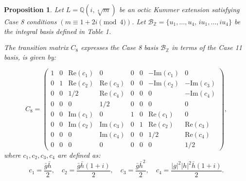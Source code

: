 \documentclass{amsart}
\theoremstyle{plain}
\newtheorem{proposition}[theorem]{Proposition}
\theoremstyle{definition}
\theoremstyle{remark}
\numberwithin{equation}{section}
\begin{document}
\begin{proposition}
Let $L = \mathbb{Q}(i, \sqrt[4]{m})$ be an octic Kummer extension satisfying Case 8 conditions $(m \equiv 1+2i \pmod 4)$. Let $\mathcal{B}_{\mathbb{Z}} = \{u_1, \dots, u_4, \, i u_1, \dots, i u_4\}$ be the integral basis defined in Table 1.

The transition matrix $C_{8}$ expresses the Case 8 basis $\mathcal{B}_{\mathbb{Z}}$ in terms of the Case 11 basis, is given by:

\[
C_{8} = \begin{pmatrix}
1 & 0 & \text{Re}(c_1) & 0 & 0 & 0 & -\text{Im}(c_1) & 0 \\
0 & 1 & \text{Re}(c_2) & \text{Re}(c_3) & 0 & 0 & -\text{Im}(c_2) & -\text{Im}(c_3) \\
0 & 0 & 1/2 & \text{Re}(c_4) & 0 & 0 & 0 & -\text{Im}(c_4) \\
0 & 0 & 0 & 1/2 & 0 & 0 & 0 & 0 \\
0 & 0 & \text{Im}(c_1) & 0 & 1 & 0 & \text{Re}(c_1) & 0 \\
0 & 0 & \text{Im}(c_2) & \text{Im}(c_3) & 0 & 1 & \text{Re}(c_2) & \text{Re}(c_3) \\
0 & 0 & 0 & \text{Im}(c_4) & 0 & 0 & 1/2 & \text{Re}(c_4) \\
0 & 0 & 0 & 0 & 0 & 0 & 0 & 1/2
\end{pmatrix},
\]
where  $c_1,c_2,c_3,c_4$ are defined as:
\[
c_1 = \frac{\bar{g}\bar{h}}{2}, \quad c_2 = \frac{\bar{g}\bar{h}(1+i)}{2}, \quad c_3 = \frac{\bar{g}\bar{h}^2}{2}, \quad c_4 = \frac{|g|^2|h|^2 \bar{h}(1+i)}{2}.
\]


\end{proposition}
\end{document}
